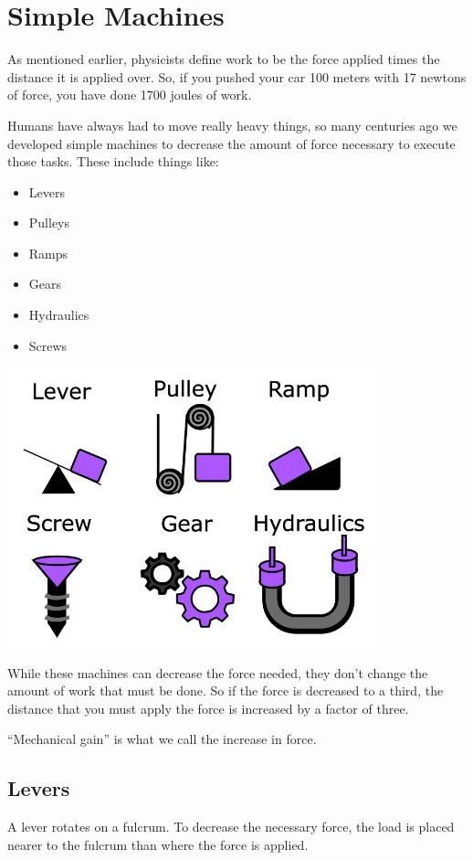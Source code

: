 \chapter{Simple Machines}

As mentioned earlier, physicists define work to be the force applied
times the distance it is applied over. So, if you pushed your car 100
meters with 17 newtons of force, you have done 1700 joules of work.

Humans have always had to move really heavy things, so many centuries
ago we developed simple machines to decrease the amount of force
necessary to execute those tasks. These include things like:
\begin{itemize}
\item Levers
\item Pulleys
\item Ramps
\item Gears
\item Hydraulics
\item Screws
\end{itemize}

\includegraphics[width=0.8\textwidth]{Simple_Machines.png}

While these machines can decrease the force needed, they don't change
the amount of work that must be done. So if the force is decreased to
a third, the distance that you must apply the force is increased by a
factor of three.

``Mechanical gain'' is what we call the increase in force.

\section{Levers}

A lever rotates on a fulcrum. To decrease the necessary force, the load
is placed nearer to the fulcrum than where the force is applied.

